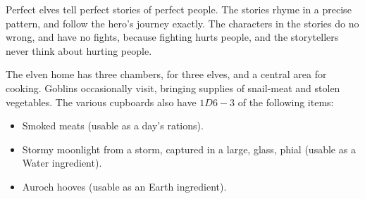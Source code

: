 \begin{multicols}{2}
Perfect elves tell perfect stories of perfect people.
The stories rhyme in a precise pattern, and follow the hero's journey exactly.
The characters in the stories do no wrong, and have no fights, because fighting hurts people, and the storytellers never think about hurting people.

The elven home has three chambers, for three elves, and a central area for cooking.
Goblins occasionally visit, bringing supplies of snail-meat and stolen vegetables.
The various cupboards also have $1D6-3$ of the following items:

\begin{itemize}
  \item
  Smoked meats (usable as a day's rations).
  \item
  Stormy moonlight from a storm, captured in a large, glass, phial (usable as a Water \gls{ingredient}).
  \item
  Auroch hooves (usable as an Earth \gls{ingredient}).
\end{itemize}

\end{multicols}

\section{}


